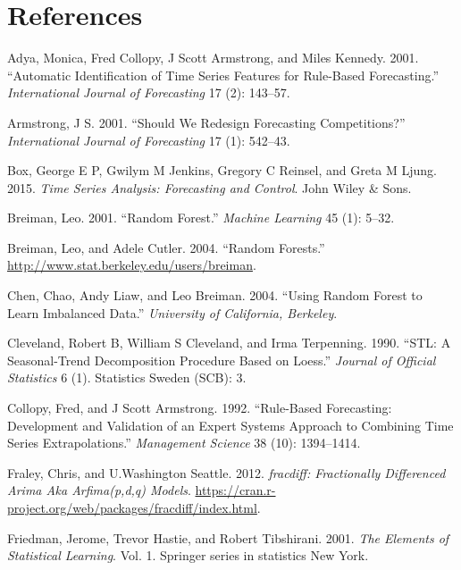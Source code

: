\documentclass[11pt,]{article}
\theoremstyle{definition}
\theoremstyle{definition}
\theoremstyle{definition}
\theoremstyle{remark}
\begin{document}
\section*{References}\label{references}

\hypertarget{refs}{}
\hypertarget{ref-adya2001automatic}{}
Adya, Monica, Fred Collopy, J Scott Armstrong, and Miles Kennedy. 2001.
``Automatic Identification of Time Series Features for Rule-Based
Forecasting.'' \emph{International Journal of Forecasting} 17 (2):
143--57.

\hypertarget{ref-armstrong2001s}{}
Armstrong, J S. 2001. ``Should We Redesign Forecasting Competitions?''
\emph{International Journal of Forecasting} 17 (1): 542--43.

\hypertarget{ref-box2015time}{}
Box, George E P, Gwilym M Jenkins, Gregory C Reinsel, and Greta M Ljung.
2015. \emph{Time Series Analysis: Forecasting and Control}. John Wiley
\& Sons.

\hypertarget{ref-breiman2001random}{}
Breiman, Leo. 2001. ``Random Forest.'' \emph{Machine Learning} 45 (1):
5--32.

\hypertarget{ref-breiman2004random}{}
Breiman, Leo, and Adele Cutler. 2004. ``Random Forests.''
\url{http://www.stat.berkeley.edu/users/breiman}.

\hypertarget{ref-chen2004using}{}
Chen, Chao, Andy Liaw, and Leo Breiman. 2004. ``Using Random Forest to
Learn Imbalanced Data.'' \emph{University of California, Berkeley}.

\hypertarget{ref-cleveland1990stl}{}
Cleveland, Robert B, William S Cleveland, and Irma Terpenning. 1990.
``STL: A Seasonal-Trend Decomposition Procedure Based on Loess.''
\emph{Journal of Official Statistics} 6 (1). Statistics Sweden (SCB): 3.

\hypertarget{ref-collopy1992rule}{}
Collopy, Fred, and J Scott Armstrong. 1992. ``Rule-Based Forecasting:
Development and Validation of an Expert Systems Approach to Combining
Time Series Extrapolations.'' \emph{Management Science} 38 (10):
1394--1414.

\hypertarget{ref-fracdiff}{}
Fraley, Chris, and U.Washington Seattle. 2012. \emph{fracdiff:
Fractionally Differenced Arima Aka Arfima(p,d,q) Models}.
\url{https://cran.r-project.org/web/packages/fracdiff/index.html}.

\hypertarget{ref-friedman2001elements}{}
Friedman, Jerome, Trevor Hastie, and Robert Tibshirani. 2001. \emph{The
Elements of Statistical Learning}. Vol. 1. Springer series in statistics
New York.
\end{document}
